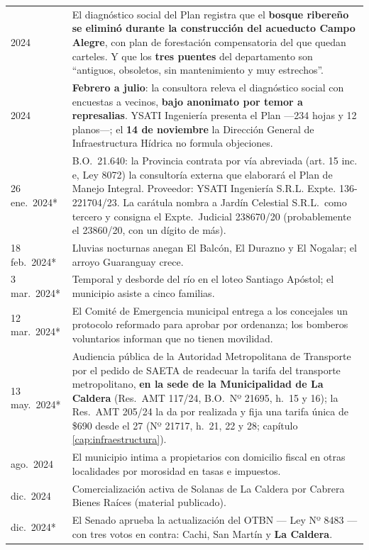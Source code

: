 \begin{longtable}{@{}p{2.7cm}p{10.3cm}@{}}
2024 & El diagnóstico social del Plan registra que el \textbf{bosque ribereño se eliminó durante la construcción del acueducto Campo Alegre}, con plan de forestación compensatoria del que quedan carteles. Y que los \textbf{tres puentes} del departamento son ``antiguos, obsoletos, sin mantenimiento y muy estrechos''. \\
2024 & \textbf{Febrero a julio}: la consultora releva el diagnóstico social con encuestas a vecinos, \textbf{bajo anonimato por temor a represalias}. YSATI Ingeniería presenta el Plan ---234 hojas y 12 planos---; el \textbf{14 de noviembre} la Dirección General de Infraestructura Hídrica no formula objeciones. \\
26 ene.\ 2024* & B.O.\ 21.640: la Provincia contrata por vía abreviada (art. 15 inc. e, Ley 8072) la consultoría externa que elaborará el Plan de Manejo Integral. Proveedor: YSATI Ingeniería S.R.L. Expte. 136-221704/23. La carátula nombra a Jardín Celestial S.R.L.\ como tercero y consigna el Expte.\ Judicial 238670/20 (probablemente el 23860/20, con un dígito de más). \\
18 feb.\ 2024* & Lluvias nocturnas anegan El Balcón, El Durazno y El Nogalar; el arroyo Guaranguay crece. \\
3 mar.\ 2024* & Temporal y desborde del río en el loteo Santiago Apóstol; el municipio asiste a cinco familias. \\
12 mar.\ 2024* & El Comité de Emergencia municipal entrega a los concejales un protocolo reformado para aprobar por ordenanza; los bomberos voluntarios informan que no tienen movilidad. \\
13 may.\ 2024* & Audiencia pública de la Autoridad Metropolitana de Transporte por el pedido de SAETA de readecuar la tarifa del transporte metropolitano, \textbf{en la sede de la Municipalidad de La Caldera} (Res.\ AMT 117/24, B.O.\ Nº 21695, h.\ 15 y 16); la Res.\ AMT 205/24 la da por realizada y fija una tarifa única de \$690 desde el 27 (Nº 21717, h.\ 21, 22 y 28; capítulo \ref{cap:infraestructura}). \\
ago.\ 2024 & El municipio intima a propietarios con domicilio fiscal en otras localidades por morosidad en tasas e impuestos. \\
dic.\ 2024 & Comercialización activa de Solanas de La Caldera por Cabrera Bienes Raíces (material publicado). \\
dic.\ 2024* & El Senado aprueba la actualización del OTBN --- Ley Nº 8483 --- con tres votos en contra: Cachi, San Martín y \textbf{La Caldera}. \\

\end{longtable}
